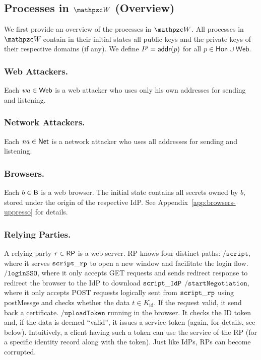 \documentclass[letterpaper,onecolumn,10pt]{article}
\begin{document}
\subsection{Processes in $\bidsystem$ (Overview)}

We first provide an overview of the processes in $\bidsystem$. All
processes in $\websystem$ contain in their initial states all public
keys and the private keys of their respective domains (if any). We
define $I^p=\mathsf{addr}(p)$ for all $p\in \mathsf{Hon} \cup \mathsf{Web}$.

\subsubsection{Web Attackers.}  Each $\mathit{wa} \in \mathsf{Web}$  is a
web attacker who uses only his own addresses for sending and listening. 

\subsubsection{Network Attackers.}  Each $\mathit{na} \in \mathsf{Net}$  is a
network attacker who uses all addresses for sending and listening. 

\subsubsection{Browsers.} Each $b \in \mathsf{B}$ is a web browser. 
The initial state contains all secrets owned by $b$, stored under the origin of the
respective IdP. See Appendix~\ref{app:browsers-uppresso} for details.

\subsubsection{Relying Parties.} 
A relying party $r \in \mathsf{RP}$ is a web server. RP knows four distinct paths: 
$\mathtt{/script}$, where it serves $\mathtt{script\_rp}$ to open a new window 
and facilitate the login flow.
$\mathtt{/loginSSO}$, where it only accepts GET requests and sends 
redirect response to redirect the browser to the IdP to download $\mathtt{script\_IdP}$
$\mathtt{/startNegotiation}$, where it only accepts POST requests logically sent 
from $\mathtt{script\_rp}$ using postMessge and checks whether the data $t\in K_\text{id}$.
If the request valid, it send back a certificate.
$\mathtt{/uploadToken}$ running in the browser. It checks the ID token and, 
if the data is deemed ``valid'', it issues a service token (again, for details, see below). 
Intuitively, a client having such a token can use the service of the RP 
(for a specific identity record along with the token). 
Just like IdPs, RPs can become corrupted.
\end{document}
